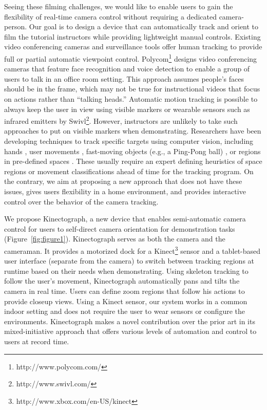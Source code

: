 Seeing these filming challenges, we would like to enable users to gain the flexibility of real-time camera control without requiring a dedicated camera-person. Our goal is to design a device that can automatically track and orient to film the tutorial instructors while providing lightweight manual controls. Existing video conferencing cameras and surveillance tools offer human tracking to provide full or partial automatic viewpoint control. Polycom\footnote{http://www.polycom.com/} designs video conferencing cameras that feature face recognition and voice detection to enable a group of users to talk in an office room setting. This approach assumes people's faces should be in the frame, which may not be true for instructional videos that focus on actions rather than ``talking heads.''
%
Automatic motion tracking is possible to always keep the user in view using visible markers \cite{Ranjan:2010} or wearable sensors such as infrared emitters by Swivl\footnote{http://www.swivl.com/}. However, instructors are unlikely to take such approaches to put on visible markers when demonstrating.
%
Researchers have been developing techniques to track specific targets using computer vision, including hands \cite{Ranjan:2008}, user movements \cite{Wilson:2012fb}, fast-moving objects (e.g., a Ping-Pong ball) \cite{Okumura:2011tr}, or regions in pre-defined spaces \cite{Ranjan:2007}. These usually require an expert defining heuristics of space regions or movement classifications ahead of time for the tracking program. On the contrary, we aim at proposing a new approach that does not have these issues, gives users flexibility in a home environment, and provides interactive control over the behavior of the camera tracking.
%
%

We propose Kinectograph, a new device that enables semi-automatic camera control for users to self-direct camera orientation for demonstration tasks (Figure~\ref{fig:figure1}). Kinectograph serves as both the camera and the cameraman. It provides a motorized dock for a Kinect\footnote{http://www.xbox.com/en-US/kinect} sensor and a tablet-based user interface (separate from the camera) to switch between tracking regions at runtime based on their needs when demonstrating. Using skeleton tracking to follow the user’s movement, Kinectograph automatically pans and tilts the camera in real time. Users can define zoom regions that follow his actions to provide closeup views. Using a Kinect sensor, our system works in a common indoor setting and does not require the user to wear sensors or configure the environments. Kinectograph makes a novel contribution over the prior art in its mixed-initiative approach that offers various levels of automation and control to users at record time.

